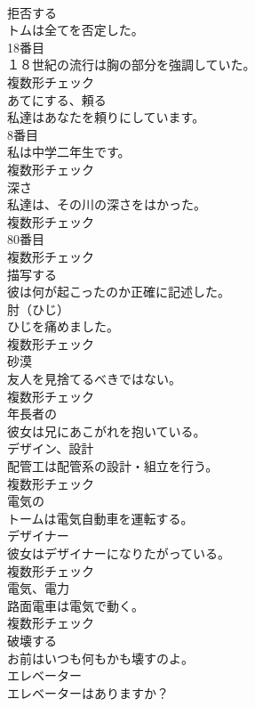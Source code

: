 \documentclass[8pt]{extreport}
\begin{document}
\begin{CJK}{UTF8}{min}
\\	[動詞]	拒否する	
\\	トムは全てを否定した。	
\\	[名詞]	18番目	
\\	１８世紀の流行は胸の部分を強調していた。	
\\	複数形チェック
\\	[動詞]	あてにする、頼る	
\\	私達はあなたを頼りにしています。	
\\	[名詞]	8番目	
\\	私は中学二年生です。	
\\	複数形チェック
\\	[名詞]	深さ	
\\	私達は、その川の深さをはかった。	
\\	複数形チェック
\\	[名詞]	80番目	
\\	複数形チェック
\\	[動詞]	描写する	
\\	彼は何が起こったのか正確に記述した。	
\\	[名詞]	肘（ひじ）	
\\	ひじを痛めました。	
\\	複数形チェック
\\	[名詞]	砂漠	
\\	友人を見捨てるべきではない。	
\\	複数形チェック
\\	[形容詞]	年⻑者の	
\\	彼女は兄にあこがれを抱いている。	
\\	[名詞]	デザイン、設計	
\\	配管工は配管系の設計・組立を行う。	
\\	複数形チェック
\\	[形容詞]	電気の	
\\	トームは電気自動車を運転する。	
\\	[名詞]	デザイナー	
\\	彼女はデザイナーになりたがっている。	
\\	複数形チェック
\\	[名詞]	電気、電力	
\\	路面電車は電気で動く。	
\\	複数形チェック
\\	[動詞]	破壊する	
\\	お前はいつも何もかも壊すのよ。	
\\	[名詞]	エレベーター	
\\	エレベーターはありますか？	

\end{CJK}
\end{document}
